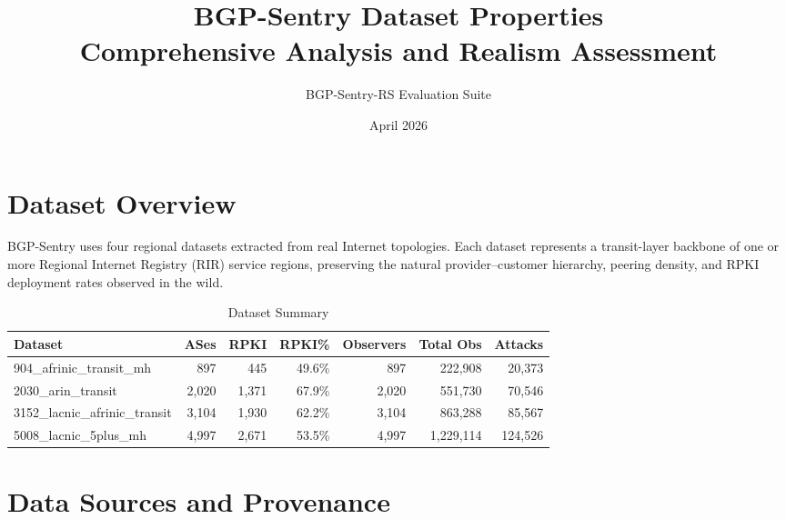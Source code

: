 \documentclass[11pt,a4paper]{article}
\title{\textbf{BGP-Sentry Dataset Properties\\[0.3em]\large Comprehensive Analysis and Realism Assessment}}
\author{BGP-Sentry-RS Evaluation Suite}
\date{April 2026}
\begin{document}
\maketitle
\tableofcontents
\newpage

\section{Dataset Overview}

BGP-Sentry uses four regional datasets extracted from real Internet topologies.
Each dataset represents a transit-layer backbone of one or more Regional Internet
Registry (RIR) service regions, preserving the natural provider--customer hierarchy,
peering density, and RPKI deployment rates observed in the wild.

\begin{table}[H]
\centering
\caption{Dataset Summary}
\label{tab:summary}
\begin{tabular}{lrrrrrr}
\toprule
\textbf{Dataset} & \textbf{ASes} & \textbf{RPKI} & \textbf{RPKI\%} & \textbf{Observers} & \textbf{Total Obs} & \textbf{Attacks} \\
\midrule
904\_afrinic\_transit\_mh   & 897   & 445   & 49.6\% & 897  & 222,908   & 20,373 \\
2030\_arin\_transit          & 2,020 & 1,371 & 67.9\% & 2,020 & 551,730  & 70,546 \\
3152\_lacnic\_afrinic\_transit & 3,104 & 1,930 & 62.2\% & 3,104 & 863,288 & 85,567 \\
5008\_lacnic\_5plus\_mh      & 4,997 & 2,671 & 53.5\% & 4,997 & 1,229,114 & 124,526 \\
\bottomrule
\end{tabular}
\end{table}

\section{Data Sources and Provenance}
\end{document}
